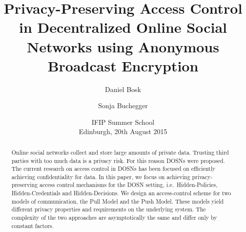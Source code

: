 \title{%
  Privacy-Preserving Access Control in
  Decentralized Online Social Networks using
  Anonymous Broadcast Encryption
}
\author{%
  Daniel Bosk \and
  Sonja Buchegger
}
\date{IFIP Summer School\\Edinburgh, 20th August 2015}


\mode* %

\begin{abstract}
  Online social networks collect and store large amounts of private data.
  Trusting third parties with too much data is a privacy risk.
  For this reason \acp{DOSN} were proposed.
  The current research on access control in \acp{DOSN} has been focused on 
  efficiently achieving confidentiality for data.
  In this paper, we focus on achieving privacy-preserving access control 
  mechanisms for the \ac{DOSN} setting, i.e.~Hidden-Policies, 
  Hidden-Credentials and Hidden-Decisions.
  We design an access-control scheme for two models of communication, the Pull 
  Model and the Push Model.
  These models yield different privacy properties and requirements on the 
  underlying system.
  The complexity of the two approaches are asymptotically the same and differ 
  only by constant factors.

\end{abstract}


